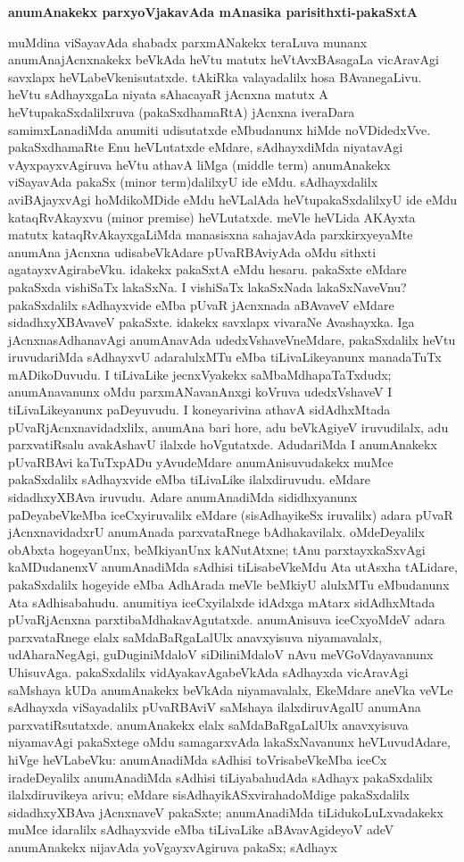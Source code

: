 \bigskip
\begin{center}
{\Large\bf anumAnakekx parxyoVjakavAda mAnasika parisithxti-pakaSxtA}
\end{center}

muMdina viSayavAda shabadx parxmANakekx teraLuva munanx anumAnajAcnxnakekx beVkAda heVtu matutx heVtAvxBAsagaLa vicAravAgi savxlapx heVLabeVkenisutatxde. tAkiRka valayadalilx hosa BAvanegaLivu. heVtu sAdhayxgaLa niyata sAhacayaR jAcnxna matutx A heVtupakaSxdalilxruva (pakaSxdhamaRtA) jAcnxna iveraDara samimxLanadiMda anumiti udisutatxde eMbudanunx hiMde noVDidedxVve. pakaSxdhamaRte Enu heVLutatxde eMdare, sAdhayxdiMda niyatavAgi vAyxpayxvAgiruva heVtu athavA liMga ({\rm middle term}) anumAnakekx viSayavAda pakaSx {\rm(minor term)}dalilxyU ide eMdu. sAdhayxdalilx aviBAjayxvAgi hoMdikoMDide eMdu heVLalAda heVtupakaSxdalilxyU ide eMdu kataqRvAkayxvu {\rm(minor premise)} heVLutatxde. meVle heVLida AKAyxta matutx kataqRvAkayxgaLiMda manasisxna sahajavAda parxkirxyeyaMte anumAna jAcnxna udisabeVkAdare pUvaRBAviyAda oMdu sithxti agatayxvAgirabeVku. idakekx pakaSxtA eMdu hesaru. pakaSxte eMdare pakaSxda vishiSaTx lakaSxNa. I vishiSaTx lakaSxNada lakaSxNaveVnu? pakaSxdalilx sAdhayxvide eMba pUvaR jAcnxnada aBAvaveV eMdare sidadhxyXBAvaveV pakaSxte. idakekx savxlapx vivaraNe Avashayxka. Iga jAcnxnasAdhanavAgi anumAnavAda udedxVshaveVneMdare, pakaSxdalilx heVtu iruvudariMda sAdhayxvU adaralulxMTu eMba tiLivaLikeyanunx manadaTuTx mADikoDuvudu. I tiLivaLike jecnxVyakekx saMbaMdhapaTaTxdudx; anumAnavanunx oMdu parxmANavanAnxgi koVruva udedxVshaveV I tiLivaLikeyanunx paDeyuvudu. I koneyarivina athavA sidAdhxMtada pUvaRjAcnxnavidadxlilx, anumAna bari hore, adu beVkAgiyeV iruvudilalx, adu parxvatiRsalu avakAshavU ilalxde hoVgutatxde. AdudariMda I anumAnakekx pUvaRBAvi kaTuTxpADu yAvudeMdare anumAnisuvudakekx muMce pakaSxdalilx sAdhayxvide eMba tiLivaLike ilalxdiruvudu. eMdare sidadhxyXBAva iruvudu. Adare anumAnadiMda sididhxyanunx paDeyabeVkeMba iceCxyiruvalilx eMdare (sisAdhayikeSx iruvalilx) adara pUvaR jAcnxnavidadxrU anumAnada parxvataRnege bAdhakavilalx. oMdeDeyalilx obAbxta hogeyanUnx, beMkiyanUnx kANutAtxne; tAnu parxtayxkaSxvAgi kaMDudanenxV anumAnadiMda sAdhisi tiLisabeVkeMdu Ata utAsxha tALidare, pakaSxdalilx hogeyide eMba AdhArada meVle beMkiyU alulxMTu eMbudanunx Ata sAdhisabahudu. anumitiya iceCxyilalxde idAdxga mAtarx sidAdhxMtada pUvaRjAcnxna parxtibaMdhakavAgutatxde. anumAnisuva iceCxyoMdeV adara parxvataRnege elalx saMdaBaRgaLalUlx anavxyisuva niyamavalalx, udAharaNegAgi, guDuginiMdaloV siDiliniMdaloV nAvu meVGoVdayavanunx UhisuvAga. pakaSxdalilx vidAyakavAgabeVkAda sAdhayxda vicAravAgi saMshaya kUDa anumAnakekx beVkAda niyamavalalx, EkeMdare aneVka veVLe sAdhayxda viSayadalilx pUvaRBAviV saMshaya ilalxdiruvAgalU anumAna parxvatiRsutatxde. anumAnakekx elalx saMdaBaRgaLalUlx anavxyisuva niyamavAgi pakaSxtege oMdu samagarxvAda lakaSxNavanunx heVLuvudAdare, hiVge heVLabeVku: anumAnadiMda sAdhisi toVrisabeVkeMba iceCx iradeDeyalilx anumAnadiMda sAdhisi tiLiyabahudAda sAdhayx pakaSxdalilx ilalxdiruvikeya arivu; eMdare sisAdhayikASxvirahadoMdige pakaSxdalilx sidadhxyXBAva jAcnxnaveV pakaSxte; anumAnadiMda tiLidukoLuLxvadakekx muMce idaralilx sAdhayxvide eMba tiLivaLike aBAvavAgideyoV adeV anumAnakekx nijavAda yoVgayxvAgiruva pakaSx; sAdhayx 